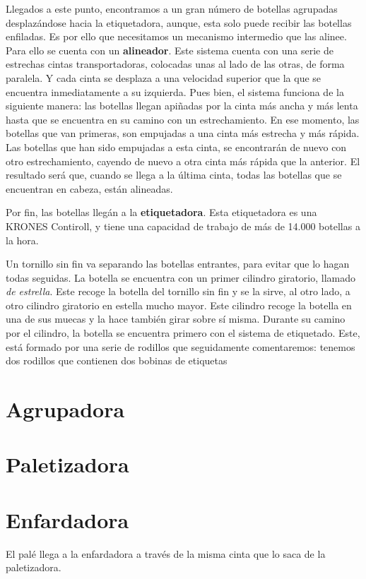 \documentclass[11pt,a4paper,spanish,twoside]{report}
\begin{document}
Llegados a este punto, encontramos a un gran número de botellas agrupadas 
desplazándose hacia la etiquetadora, aunque, esta solo puede recibir las 
botellas enfiladas. Es por ello que necesitamos un mecanismo intermedio que 
las alinee. Para ello se cuenta con un \textbf{alineador}. Este sistema cuenta
con una serie de estrechas cintas transportadoras, colocadas unas al lado de
las otras, de forma paralela. Y cada cinta se desplaza a una velocidad 
superior que la que se encuentra inmediatamente a su izquierda. Pues bien, el
sistema funciona de la siguiente manera: las botellas llegan apiñadas por la 
cinta más ancha y más lenta hasta que se encuentra en su camino con un 
estrechamiento. En ese momento, las botellas que van primeras, son empujadas
a una cinta más estrecha y más rápida. Las botellas que han sido empujadas a
esta cinta, se encontrarán de nuevo con otro estrechamiento, cayendo de nuevo
a otra cinta más rápida que la anterior. El resultado será que, cuando se 
llega a la última cinta, todas las botellas que se encuentran en cabeza, están
alineadas.

Por fin, las botellas llegán a la \textbf{etiquetadora}. Esta etiquetadora es 
una KRONES Contiroll, y tiene una capacidad de trabajo de más de 14.000 
botellas a la hora.

Un tornillo sin fin va separando las botellas entrantes, para evitar que lo 
hagan todas seguidas. La botella se encuentra con un primer cilindro 
giratorio, llamado \emph{de estrella}. Este recoge la botella del tornillo sin
fin y se la sirve, al otro lado, a otro cilindro giratorio en estella mucho 
mayor. Este cilindro recoge la botella en una de sus muecas y la hace también 
girar sobre sí misma. Durante su camino por el cilindro, la botella se 
encuentra primero con el sistema de etiquetado. Este, está formado por una 
serie de rodillos que seguidamente comentaremos: tenemos dos rodillos que 
contienen dos bobinas de etiquetas

\section{Agrupadora}

\section{Paletizadora}

\section{Enfardadora}
El palé llega a la enfardadora a través de la misma cinta que lo saca de la 
paletizadora. 
\end{document}
